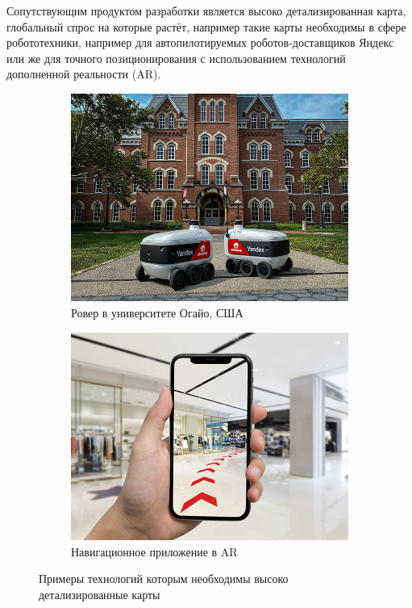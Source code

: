     Сопутствующим продуктом разработки является высоко детализированная карта, глобальный спрос на которые растёт, например такие карты необходимы в сфере робототехники, например для автопилотируемых роботов-доставщиков Яндекс или же для точного позиционирования с использованием технологий дополненной реальности (AR).
    \begin{figure}[H]
      \centering
      \begin{subfigure}[b]{0.45\textwidth}
        \centering
        \includegraphics[width=\textwidth]{assets/img/rover.jpg}
        \caption{Ровер в университете Огайо, США}
      \end{subfigure}
      \hfill
      \begin{subfigure}[b]{.45\textwidth}
        \centering
        \includegraphics[width=\textwidth]{assets/img/AR.jpg}
        \caption{Навигационное приложение в AR}
      \end{subfigure}
      \caption{Примеры технологий которым необходимы высоко детализированные карты}
    \end{figure}

